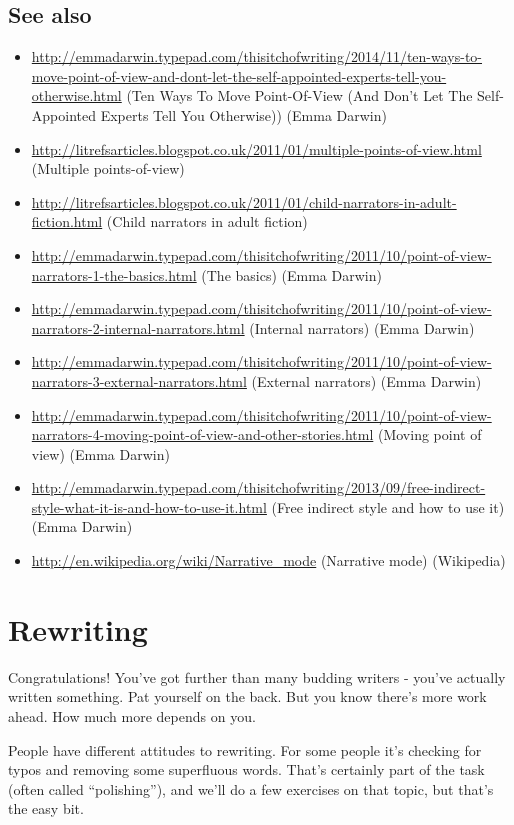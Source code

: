\documentclass[11pt]{article}
\begin{document}
\subsection*{See also}
\begin{itemize}
\item \url{http://emmadarwin.typepad.com/thisitchofwriting/2014/11/ten-ways-to-move-point-of-view-and-dont-let-the-self-appointed-experts-tell-you-otherwise.html} (Ten Ways To Move Point-Of-View (And Don't Let The Self-Appointed Experts Tell You Otherwise)) (Emma Darwin)
\item \url{http://litrefsarticles.blogspot.co.uk/2011/01/multiple-points-of-view.html} (Multiple points-of-view)
\item \url{http://litrefsarticles.blogspot.co.uk/2011/01/child-narrators-in-adult-fiction.html} (Child narrators in adult fiction)
\item \url{http://emmadarwin.typepad.com/thisitchofwriting/2011/10/point-of-view-narrators-1-the-basics.html} (The basics) (Emma Darwin)

\item \url{http://emmadarwin.typepad.com/thisitchofwriting/2011/10/point-of-view-narrators-2-internal-narrators.html} (Internal narrators) (Emma Darwin)
\item \url{http://emmadarwin.typepad.com/thisitchofwriting/2011/10/point-of-view-narrators-3-external-narrators.html} (External narrators) (Emma Darwin)
\item \url{http://emmadarwin.typepad.com/thisitchofwriting/2011/10/point-of-view-narrators-4-moving-point-of-view-and-other-stories.html} (Moving point of view) (Emma Darwin)
\item \url{http://emmadarwin.typepad.com/thisitchofwriting/2013/09/free-indirect-style-what-it-is-and-how-to-use-it.html} (Free indirect style and how to use it) (Emma Darwin)
\item \url{http://en.wikipedia.org/wiki/Narrative_mode} (Narrative mode) (Wikipedia)
\end{itemize}

\newpage
\section{Rewriting}

Congratulations! You've got further than many budding writers - you've actually written something. Pat yourself on the back. But you know there's more work ahead. How much more depends on you.


People have different attitudes to rewriting. For some people it's checking for typos and
removing some superfluous words. That's certainly part of the task (often called ``polishing''), and we'll do a few
exercises on that topic, but that's the easy bit.
\end{document}
